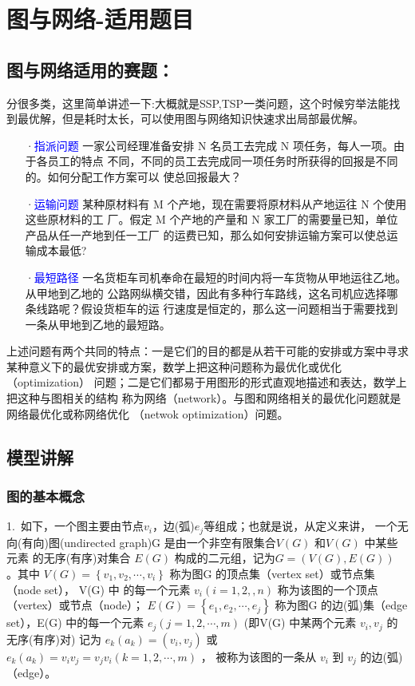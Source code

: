\documentclass[a4paper,20pt]{article}
\begin{document}
\section{图与网络-适用题目}
\subsection{图与网络适用的赛题：}
分很多类，这里简单讲述一下:大概就是SSP,TSP一类问题，这个时候穷举法能找到最优解，但是耗时太长，可以使用图与网络知识快速求出局部最优解。
\begin{itemize}
    \item[·\textcolor{blue}{指派问题}] 一家公司经理准备安排 N 名员工去完成 N 项任务，每人一项。由于各员工的特点
        不同，不同的员工去完成同一项任务时所获得的回报是不同的。如何分配工作方案可以
        使总回报最大？
    \item[·\textcolor{blue}{运输问题}] 某种原材料有 M 个产地，现在需要将原材料从产地运往 N 个使用这些原材料的工
        厂。假定 M 个产地的产量和 N 家工厂的需要量已知，单位产品从任一产地到任一工厂
        的运费已知，那么如何安排运输方案可以使总运输成本最低?
    \item[·\textcolor{blue}{最短路径}] 一名货柜车司机奉命在最短的时间内将一车货物从甲地运往乙地。从甲地到乙地的
        公路网纵横交错，因此有多种行车路线，这名司机应选择哪条线路呢？假设货柜车的运
        行速度是恒定的，那么这一问题相当于需要找到一条从甲地到乙地的最短路。
\end{itemize}


\par 上述问题有两个共同的特点：一是它们的目的都是从若干可能的安排或方案中寻求
某种意义下的最优安排或方案，数学上把这种问题称为最优化或优化（optimization）
问题；二是它们都易于用图形的形式直观地描述和表达，数学上把这种与图相关的结构
称为网络（network）。与图和网络相关的最优化问题就是网络最优化或称网络优化
（netwok optimization）问题。
\subsection{模型讲解}
\subsubsection{图的基本概念}
1.~如下，一个图主要由节点$v_i$，边(弧)$e_j$等组成；也就是说，从定义来讲，
一个无向(有向)图(undirected graph)G 是由一个非空有限集合$V (G)$ 和$V (G)$ 中某些元素
的无序(有序)对集合 $E(G)$ 构成的二元组，记为$ G = (V (G),E(G))$ 。其中
$V(G )=\left\{v_1,v_2,\cdots,v_i\right\} $ 称为图G 的顶点集（vertex set）或节点集（node set）， V(G) 中
的每一个元素 $v_i (i= 1,2, ,n)$  称为该图的一个顶点（vertex）或节点（node）；
$E(G )= \left\{ e_1,e_2 ,\cdots ,e_j \right\}$ 称为图G 的边(弧)集（edge set），E(G) 中的每一个元素 $e_j(j=1,2,\cdots,m)$ (即V(G)
中某两个元素 $v_i,v_j$ 的无序(有序)对) 记为 $e_k(a_k)=(v_i,v_j)$ 或 $e_k(a_k)=v_iv_j=v_jv_i(k=1,2,\cdots,m)$ ，
被称为该图的一条从 $v_i$ 到 $v_j$ 的边(弧)（edge）。
\end{document}

